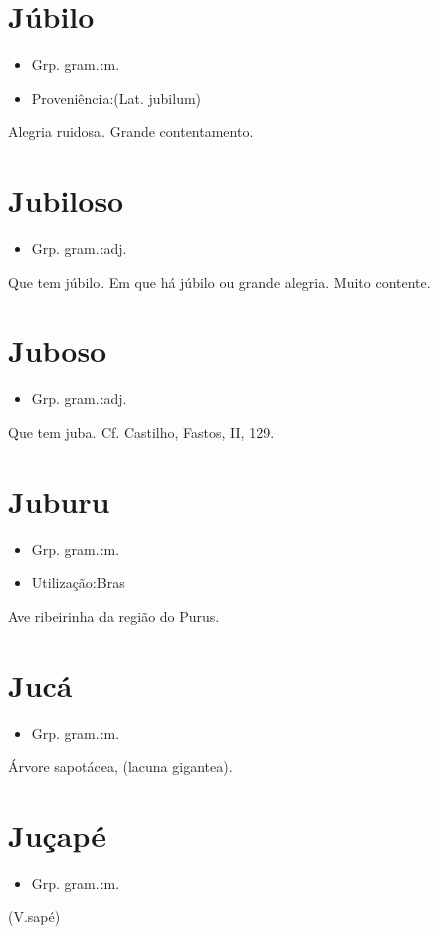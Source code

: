 \documentclass{article}
\begin{document}
\section{Júbilo}
\begin{itemize}
\item {Grp. gram.:m.}
\end{itemize}
\begin{itemize}
\item {Proveniência:(Lat. \textunderscore jubilum\textunderscore )}
\end{itemize}
Alegria ruidosa.
Grande contentamento.
\section{Jubiloso}
\begin{itemize}
\item {Grp. gram.:adj.}
\end{itemize}
Que tem júbilo.
Em que há júbilo ou grande alegria.
Muito contente.
\section{Juboso}
\begin{itemize}
\item {Grp. gram.:adj.}
\end{itemize}
Que tem juba. Cf. Castilho, \textunderscore Fastos\textunderscore , II, 129.
\section{Juburu}
\begin{itemize}
\item {Grp. gram.:m.}
\end{itemize}
\begin{itemize}
\item {Utilização:Bras}
\end{itemize}
Ave ribeirinha da região do Purus.
\section{Jucá}
\begin{itemize}
\item {Grp. gram.:m.}
\end{itemize}
Árvore sapotácea, (\textunderscore lacuna gigantea\textunderscore ).
\section{Juçapé}
\begin{itemize}
\item {Grp. gram.:m.}
\end{itemize}
(V.sapé)
\end{document}
